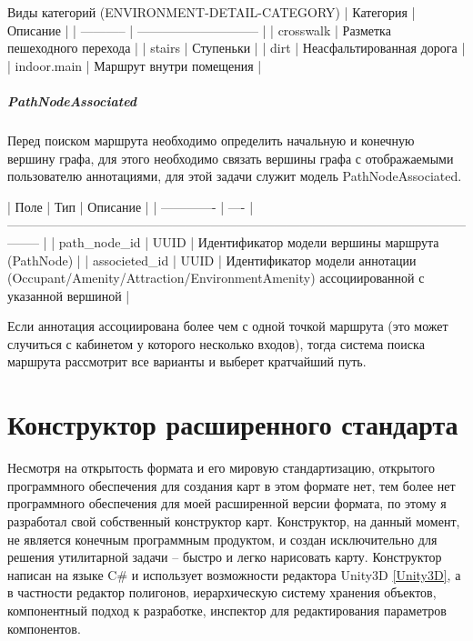           Виды категорий (ENVIRONMENT-DETAIL-CATEGORY)
          | Категория   | Описание                      |
          | ----------- | ----------------------------- |
          | crosswalk   | Разметка пешеходного перехода |
          | stairs      | Ступеньки                     |
          | dirt        | Неасфальтированная дорога     |
          | indoor.main | Маршрут внутри помещения      |

        \subparagraph{PathNodeAssociated}
          Перед поиском маршрута необходимо определить начальную и конечную вершину графа, для этого необходимо связать вершины графа с отображаемыми пользователю аннотациями, для этой задачи служит модель PathNodeAssociated.

          | Поле          | Тип  | Описание                                                                                                             |
          | ------------- | ---- | -------------------------------------------------------------------------------------------------------------------- |
          | path\_node\_id  | UUID | Идентификатор модели вершины маршрута (PathNode)                                                                     |
          | associeted\_id | UUID | Идентификатор модели аннотации (Occupant/Amenity/Attraction/EnvironmentAmenity) ассоциированной с указанной вершиной |

          Если аннотация ассоциирована более чем с одной точкой маршрута (это может случиться с кабинетом у которого несколько входов), тогда система поиска маршрута рассмотрит все варианты и выберет кратчайший путь.

  \section{Конструктор расширенного стандарта}
    Несмотря на открытость формата и его мировую стандартизацию, открытого программного обеспечения для создания карт в этом формате нет, тем более нет программного обеспечения для моей расширенной версии формата, по этому я разработал свой собственный конструктор карт. Конструктор, на данный момент, не является конечным программным продуктом, и создан исключительно для решения утилитарной задачи -- быстро и легко нарисовать карту. Конструктор написан на языке C\# и использует возможности редактора Unity3D \ref{Unity3D}, а в частности редактор полигонов, иерархическую систему хранения объектов, компонентный подход к разработке, инспектор для редактирования параметров компонентов.

